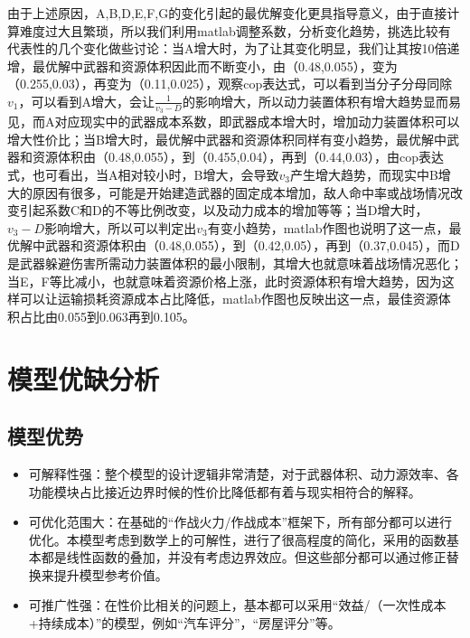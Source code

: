 \documentclass[UTF8]{mcmthesis}
\begin{document}
由于上述原因，A,B,D,E,F,G的变化引起的最优解变化更具指导意义，由于直接计算难度过大且繁琐，所以我们利用matlab调整系数，分析变化趋势，挑选比较有代表性的几个变化做些讨论：当A增大时，为了让其变化明显，我们让其按10倍递增，最优解中武器和资源体积因此而不断变小，由（0.48,0.055），变为（0.255,0.03），再变为（0.11,0.025），观察cop表达式，可以看到当分子分母同除$v_1$，可以看到A增大，会让$\frac{1}{v_3-D}$的影响增大，所以动力装置体积有增大趋势显而易见，而A对应现实中的武器成本系数，即武器成本增大时，增加动力装置体积可以增大性价比；当B增大时，最优解中武器和资源体积同样有变小趋势，最优解中武器和资源体积由（0.48,0.055），到（0.455,0.04），再到（0.44,0.03），由cop表达式，也可看出，当A相对较小时，B增大，会导致$v_3$产生增大趋势，而现实中B增大的原因有很多，可能是开始建造武器的固定成本增加，敌人命中率或战场情况改变引起系数C和D的不等比例改变，以及动力成本的增加等等；当D增大时，$v_3-D$影响增大，所以可以判定出$v_3$有变小趋势，matlab作图也说明了这一点，最优解中武器和资源体积由（0.48,0.055），到（0.42,0.05），再到（0.37,0.045），而D是武器躲避伤害所需动力装置体积的最小限制，其增大也就意味着战场情况恶化；当E，F等比减小，也就意味着资源价格上涨，此时资源体积有增大趋势，因为这样可以让运输损耗资源成本占比降低，matlab作图也反映出这一点，最佳资源体积占比由0.055到0.063再到0.105。

\section{模型优缺分析}
\subsection{模型优势}
\begin{itemize}
\item 可解释性强：整个模型的设计逻辑非常清楚，对于武器体积、动力源效率、各功能模块占比接近边界时候的性价比降低都有着与现实相符合的解释。
\item 可优化范围大：在基础的“作战火力/作战成本”框架下，所有部分都可以进行优化。本模型考虑到数学上的可解性，进行了很高程度的简化，采用的函数基本都是线性函数的叠加，并没有考虑边界效应。但这些部分都可以通过修正替换来提升模型参考价值。
\item 可推广性强：在性价比相关的问题上，基本都可以采用“效益/（一次性成本+持续成本）”的模型，例如“汽车评分”，“房屋评分”等。
\end{itemize}
\end{document}
